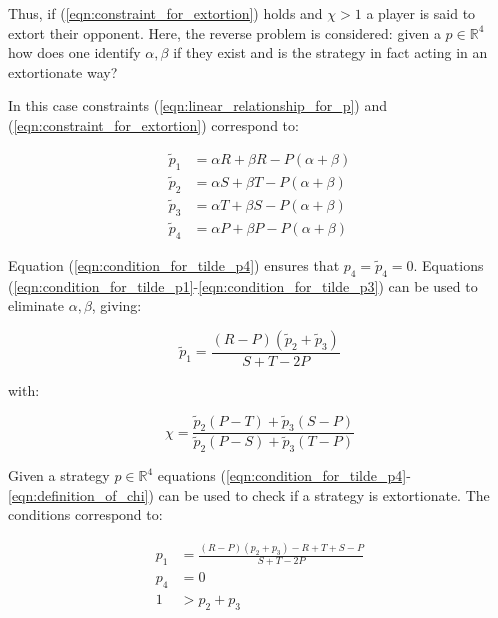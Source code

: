 \documentclass[a4paper]{article}
\begin{document}
Thus, if (\ref{eqn:constraint_for_extortion}) holds and \(\chi >1\) a player is
said to extort their opponent.
Here, the reverse problem is considered: given a
\(p\in\mathbb{R}^4\) how does one identify \(\alpha, \beta\) if they
exist and is the strategy in fact acting in an extortionate way?

In this case constraints (\ref{eqn:linear_relationship_for_p}) and
(\ref{eqn:constraint_for_extortion}) correspond to:

\begin{align}
    \tilde p_1 & = \alpha R + \beta R - P (\alpha + \beta)
            \label{eqn:condition_for_tilde_p1}\\
    \tilde p_2 & = \alpha S + \beta T - P (\alpha + \beta)
            \label{eqn:condition_for_tilde_p2}\\
    \tilde p_3 & = \alpha T + \beta S - P (\alpha + \beta)
            \label{eqn:condition_for_tilde_p3}\\
    \tilde p_4 & = \alpha P + \beta P - P (\alpha + \beta)
            \label{eqn:condition_for_tilde_p4}
\end{align}

Equation (\ref{eqn:condition_for_tilde_p4}) ensures that \(p_4=\tilde p_4=0\).
Equations (\ref{eqn:condition_for_tilde_p1}-\ref{eqn:condition_for_tilde_p3})
can be used to eliminate \(\alpha, \beta\), giving:

\begin{equation}\label{eqn:planar_definition_of_extortion}
    \tilde p_1 = \frac{(R - P)(\tilde p_2 + \tilde p_3)}{S + T - 2P}
\end{equation}

with:

\begin{equation}\label{eqn:definition_of_chi}
    \chi = \frac{\tilde p_2 (P - T) + \tilde p_3 (S - P)}
                {\tilde p_2 (P - S) + \tilde p_3 (T - P)}
\end{equation}

Given a strategy \(p\in\mathbb{R}^{4}\) equations
(\ref{eqn:condition_for_tilde_p4}-\ref{eqn:definition_of_chi}) can be used to
check if a strategy is extortionate. The conditions correspond to:

\begin{align}
    p_1 & = \frac{(R-P)(p_2 + p_3) - R + T + S - P}{S + T - 2P}
     \label{eqn:condition_for_p1}\\
    p_4 & = 0 \label{eqn:condition_for_p4}\\
    1 & > p_2 + p_3\label{eqn:condition_for_chi}
\end{align}
\end{document}
